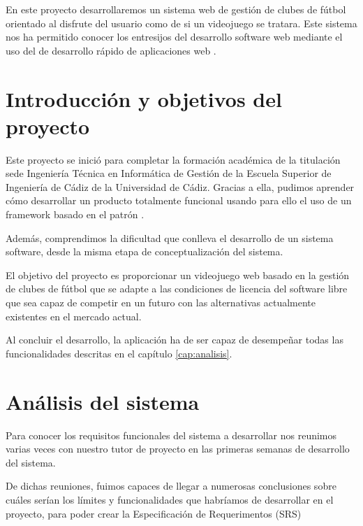 

En este proyecto desarrollaremos un sistema web de gestión de clubes de fútbol orientado al disfrute
del usuario como de si un videojuego se tratara. Este sistema nos ha permitido
conocer los entresijos del desarrollo software web mediante el uso del
 de desarrollo rápido de aplicaciones web .

\section{Introducción y objetivos del proyecto}
Este proyecto se inició para completar la formación académica de la titulación
sede Ingeniería Técnica en Informática de Gestión de la Escuela Superior de
Ingeniería de Cádiz de la Universidad de Cádiz. Gracias a ella, pudimos aprender
cómo desarrollar un producto totalmente funcional usando para ello el uso de un
framework basado en el patrón  . 

Además, comprendimos la dificultad que conlleva el desarrollo de un sistema
software, desde la misma etapa de conceptualización del sistema.

El objetivo del proyecto es proporcionar un videojuego web basado en la gestión
de clubes de fútbol que se adapte a las condiciones de licencia del software
libre que sea capaz de competir en un futuro con las alternativas actualmente
existentes en el mercado actual.

Al concluir el desarrollo, la aplicación ha de ser capaz de desempeñar todas las
funcionalidades descritas en el capítulo \ref{cap:analisis}.

\section{Análisis del sistema}
Para conocer los requisitos funcionales del sistema a desarrollar nos reunimos
varias veces con nuestro tutor de proyecto en las primeras semanas de desarrollo
del sistema.

De dichas reuniones, fuimos capaces de llegar a numerosas conclusiones sobre
cuáles serían los límites y funcionalidades que habríamos de desarrollar en el
proyecto, para poder crear la Especificación de Requerimentos (SRS)
\cite{doc:requisitos}

